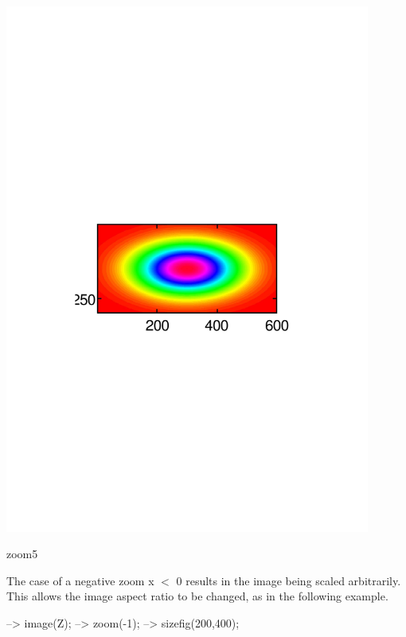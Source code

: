  
\begin{DoxyImage}
\includegraphics[width=12cm]{zoom5}
\caption{zoom5}
\end{DoxyImage}


The case of a negative zoom {\ttfamily x $<$ 0} results in the image being scaled arbitrarily. This allows the image aspect ratio to be changed, as in the following example.


\begin{DoxyVerbInclude}
--> image(Z);
--> zoom(-1);
--> sizefig(200,400);
\end{DoxyVerbInclude}


